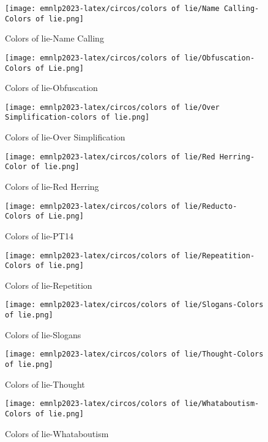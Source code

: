 \begin{figure*}[htbp]
    \begin{subfigure}[b]{0.33\textwidth}
    \centering
        \texttt{[image: emnlp2023-latex/circos/colors of lie/Name Calling-Colors of lie.png]}
        \caption{Colors of lie-Name Calling}
    \end{subfigure}
    \begin{subfigure}[b]{0.33\textwidth}
    \centering
        \texttt{[image: emnlp2023-latex/circos/colors of lie/Obfuscation-Colors of Lie.png]}
        \caption{Colors of lie-Obfuscation}
    \end{subfigure}    
    \begin{subfigure}[b]{0.33\textwidth}
    \centering
        \texttt{[image: emnlp2023-latex/circos/colors of lie/Over Simplification-colors of lie.png]}
        \caption{Colors of lie-Over Simplification}
    \end{subfigure}
    \begin{subfigure}[b]{0.33\textwidth}
    \centering
        \texttt{[image: emnlp2023-latex/circos/colors of lie/Red Herring-Color of lie.png]}
        \caption{Colors of lie-Red Herring}
    \end{subfigure}
    \begin{subfigure}[b]{0.33\textwidth}
    \centering
        \texttt{[image: emnlp2023-latex/circos/colors of lie/Reducto- Colors of Lie.png]}
        \caption{Colors of lie-PT14}
    \end{subfigure}
    \begin{subfigure}[b]{0.33\textwidth}
    \centering
        \texttt{[image: emnlp2023-latex/circos/colors of lie/Repeatition- Colors of lie.png]}
        \caption{Colors of lie-Repetition}
    \end{subfigure}
    \begin{subfigure}[b]{0.33\textwidth}
    \centering
        \texttt{[image: emnlp2023-latex/circos/colors of lie/Slogans-Colors of lie.png]}
        \caption{Colors of lie-Slogans}
    \end{subfigure}
    \begin{subfigure}[b]{0.33\textwidth}
    \centering
        \texttt{[image: emnlp2023-latex/circos/colors of lie/Thought-Colors of lie.png]}
        \caption{Colors of lie-Thought}
    \end{subfigure}
    \begin{subfigure}[b]{0.33\textwidth}
    \centering
        \texttt{[image: emnlp2023-latex/circos/colors of lie/Whataboutism-Colors of lie.png]}
        \caption{Colors of lie-Whataboutism}
    \end{subfigure}
\end{figure*}
